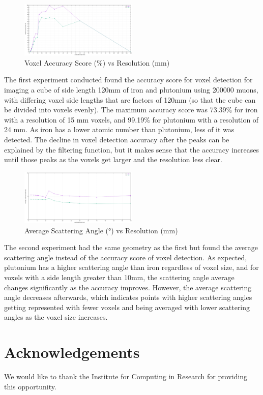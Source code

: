 \documentclass[10pt,a4paper]{article}
\begin{document}
\begin{figure}
\centering
\includegraphics[width=0.5\textwidth]{images/smaller voxel accuracy score vs side len.png}
    \caption{Voxel Accuracy Score (\(\%\)) vs Resolution (mm)}
\end{figure}

\noindent The first experiment conducted found the accuracy score for voxel detection for imaging a cube of side length 120mm of iron and plutonium using 200000 muons, with differing voxel side lengths that are factors of 120mm (so that the cube can be divided into voxels evenly). The maximum accuracy score was 73.39\(\%\) for iron with a resolution of 15 mm voxels, and 99.19\(\%\) for plutonium with a resolution of 24 mm. As iron has a lower atomic number than plutonium, less of it was detected. The decline in voxel detection accuracy after the peaks can be explained by the filtering function, but it makes sense that the accuracy increases until those peaks as the voxels get larger and the resolution less clear.


\begin{figure}
\centering
\includegraphics[width=0.5\textwidth]{images/smaller avg scattering angle vs voxel side length.png}
    \caption{Average Scattering Angle (°) vs Resolution (mm)}
\end{figure}
    The second experiment had the same geometry as the first but found the average scattering angle instead of the accuracy score of voxel detection. As expected, plutonium has a higher scattering angle than iron regardless of voxel size, and for voxels with a side length greater than 10mm, the scattering angle average changes significantly as the accuracy improves. However, the average scattering angle decreases afterwards, which indicates points with higher scattering angles getting represented with fewer voxels and being averaged with lower scattering angles as the voxel size increases.

\section{Acknowledgements}
    We would like to thank the Institute for Computing in Research for providing this opportunity.



\end{document}
